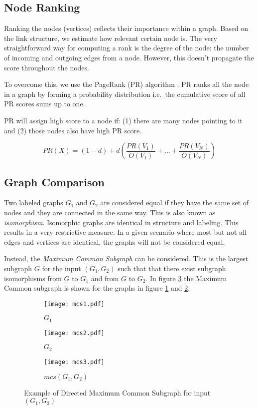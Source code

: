 \subsection{Node Ranking}
Ranking the nodes (vertices) reflects their importance within a graph. 
Based on the link structure, we estimate how relevant certain node is.
The very straightforward way for computing a rank is the degree of the node: the number of incoming and outgoing  edges from a node. However, this doesn’t propagate the score throughout the nodes.

To overcome this, we use the PageRank (PR) algorithm \cite{PageRank}. PR ranks all the node in a graph by forming a probability distribution i.e.\ the cumulative score of all PR scores sums up to one. 

PR will assign high score to a node if: (1) there are many nodes pointing to it and (2) those nodes also have high PR score.


\begin{equation}
	PR(X) = (1-d) + d(\dfrac{PR(V_{1})}{O(V_{1})} + ... + \dfrac{PR(V_{N})}{O(V_{N})})
\end{equation}

\subsection{Graph Comparison}

Two labeled graphs $G_{1}$ and $G_{2}$ are considered equal if they have the same set of nodes and they are connected in the same way. 
This is also known as \emph{isomorphism}\cite{Wilson:1986:IGT:22577}. 
Isomorphic graphs are identical in structure and labeling. 
This results in a very restrictive measure. 
In a given scenario where most but not all edges and vertices are identical,
the graphs will not be considered equal.

Instead, the \emph{Maximum Common Subgraph} can be considered.
This is the largest subgraph $G$ for the input $(G_{1},G_{2})$ 
such that that there exist subgraph isomorphisms from $G$ to $G_{1}$ and from $G$ to $G_{2}$.
In figure \ref{fig:mcs3} the Maximum Common subgraph is shown for the graphs in figure \ref{fig:mcs1} and \ref{fig:mcs2}.

\begin{figure}[t]
	\begin{subfigure}{.3\textwidth}
		\centering
		\texttt{[image: mcs1.pdf]}
		\caption{$G_{1}$}
		\label{fig:mcs1}
	\end{subfigure}%
	\begin{subfigure}{.3\textwidth}
		\centering
		\texttt{[image: mcs2.pdf]}
		\caption{$G_{2}$}
		\label{fig:mcs2}
	\end{subfigure}
\begin{subfigure}{.3\textwidth}
	\centering
	\texttt{[image: mcs3.pdf]}
	\caption{$mcs(G_{1},G_{2})$}
	\label{fig:mcs3}
\end{subfigure}
	\caption{Example of Directed Maximum Common Subgraph for input $(G_{1},G_{2})$ }
	\label{fig:mcs}
\end{figure}
 
